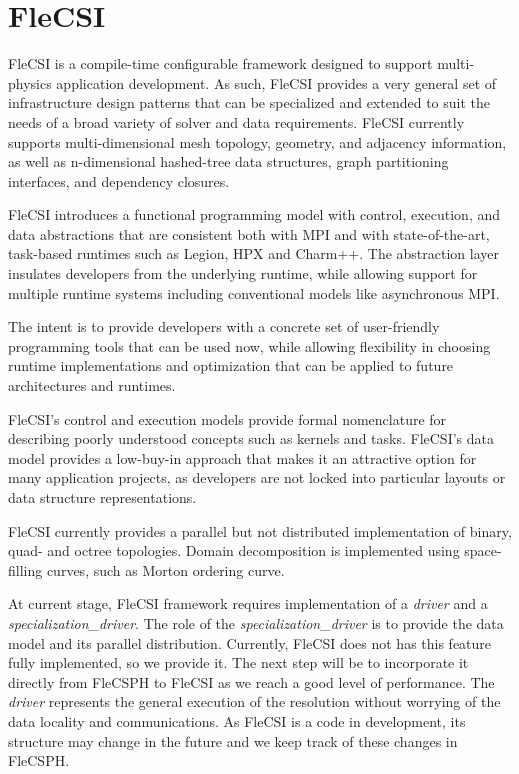 \documentclass[notes.tex]{subfiles}
\begin{document}
\section{FleCSI}
FleCSI is a compile-time configurable framework designed to support
multi-physics application development.
As such, FleCSI provides a very general set of infrastructure design patterns
that can be specialized and extended to suit the needs of a broad variety of
solver and data requirements.
FleCSI currently supports multi-dimensional mesh topology, geometry, and
adjacency information, as well as n-dimensional hashed-tree data structures,
graph partitioning interfaces, and dependency closures.

FleCSI introduces a functional programming model with control, execution, and
data abstractions that are consistent both with MPI and with state-of-the-art,
task-based runtimes such as Legion, HPX and Charm++.
The abstraction layer insulates developers from the underlying runtime, while
allowing support for multiple runtime systems including conventional models
like asynchronous MPI.

The intent is to provide developers with a concrete set of user-friendly
programming tools that can be used now, while allowing flexibility in choosing
runtime implementations and optimization that can be applied to future
architectures and runtimes.

FleCSI's control and execution models provide formal nomenclature for
describing poorly understood concepts such as kernels and tasks.
FleCSI's data model provides a low-buy-in approach that makes it an attractive
option for many application projects, as developers are not locked into
particular layouts or data structure representations.

FleCSI currently provides a parallel but not distributed implementation of
binary, quad- and octree topologies.
Domain decomposition is implemented using space-filling curves, such as Morton
ordering curve.

At current stage, FleCSI framework requires implementation of a \textit{driver} 
and a \textit{specialization\_driver}.
The role of the \textit{specialization\_driver} is to provide the data model
and its parallel distribution.
Currently, FleCSI does not has this feature fully implemented, so we provide it.
The next step will be to incorporate it directly from FleCSPH to FleCSI as we
reach a good level of performance.
The \textit{driver} represents the general execution of the resolution without
worrying of the data locality and communications.
As FleCSI is a code in development, its structure may change in the future and
we keep track of these changes in FleCSPH.
\end{document}
